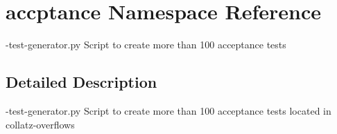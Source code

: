 \hypertarget{namespaceaccptance}{\section{accptance Namespace Reference}
\label{namespaceaccptance}
}


-\/test-\/generator.\-py Script to create more than 100 acceptance tests  




\subsection{Detailed Description}
-\/test-\/generator.\-py Script to create more than 100 acceptance tests located in collatz-\/overflows 